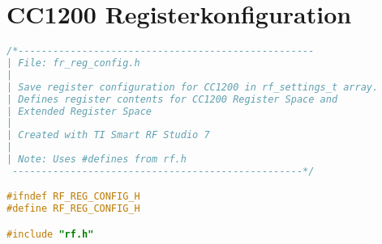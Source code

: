 \chapter{CC1200 Registerkonfiguration}\label{ahg:cc1200register}
\begin{lstlisting}[language=C,frame=b,captionpos=b,caption={Struktur mit Adresse-Wert Paaren für die Registerkonfiguration des CC1200 Funkchips},label=lst:cc1200register]
/*---------------------------------------------------
| File: fr_reg_config.h
|
| Save register configuration for CC1200 in rf_settings_t array.
| Defines register contents for CC1200 Register Space and
| Extended Register Space
|
| Created with TI Smart RF Studio 7
|
| Note: Uses #defines from rf.h
 --------------------------------------------------*/

#ifndef RF_REG_CONFIG_H
#define RF_REG_CONFIG_H

#include "rf.h"


\end{lstlisting}
